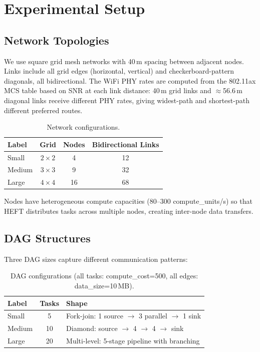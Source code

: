 \documentclass[11pt]{article}
\begin{document}
\section{Experimental Setup}

\subsection{Network Topologies}

We use square grid mesh networks with 40\,m spacing between adjacent nodes.
Links include all grid edges (horizontal, vertical) and checkerboard-pattern
diagonals, all bidirectional. The WiFi PHY rates are computed from the
802.11ax MCS table based on SNR at each link distance: 40\,m grid links and
$\approx$56.6\,m diagonal links receive different PHY rates, giving widest-path
and shortest-path different preferred routes.

\begin{table}[h]
\centering
\caption{Network configurations.}
\label{tab:networks}
\begin{tabular}{lccc}
\toprule
Label & Grid & Nodes & Bidirectional Links \\
\midrule
Small   & $2\times2$ & 4  & 12 \\
Medium  & $3\times3$ & 9  & 32 \\
Large   & $4\times4$ & 16 & 68 \\
\bottomrule
\end{tabular}
\end{table}

Nodes have heterogeneous compute capacities (80--300 compute\_units/s) so that
HEFT distributes tasks across multiple nodes, creating inter-node data
transfers.

\subsection{DAG Structures}

Three DAG sizes capture different communication patterns:

\begin{table}[h]
\centering
\caption{DAG configurations (all tasks: compute\_cost=500, all edges: data\_size=10\,MB).}
\label{tab:dags}
\begin{tabular}{lcl}
\toprule
Label & Tasks & Shape \\
\midrule
Small  & 5  & Fork-join: 1 source $\to$ 3 parallel $\to$ 1 sink \\
Medium & 10 & Diamond: source $\to$ 4 $\to$ 4 $\to$ sink \\
Large  & 20 & Multi-level: 5-stage pipeline with branching \\
\bottomrule
\end{tabular}
\end{table}
\end{document}
